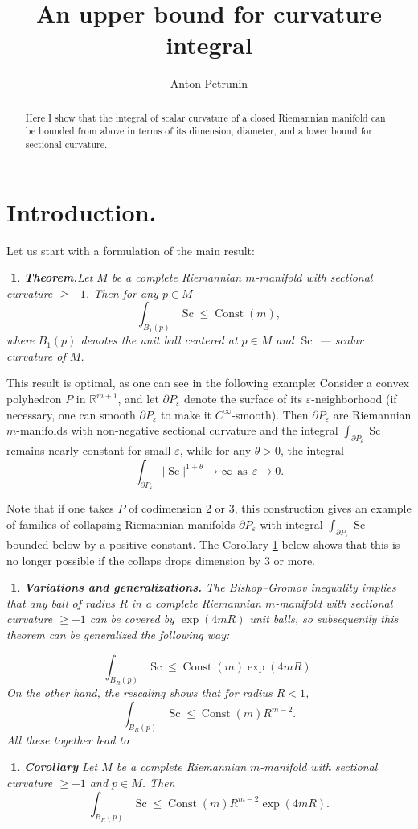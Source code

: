 \documentclass{article}
\def\thetitle{An upper bound for curvature integral}
\def\theauthors{Anton Petrunin}
\def\RR{\mathbb{R}}
\def\eps{\varepsilon}
\def\ge{\geqslant}
\def\le{\leqslant}
\def\Const{\operatorname{Const}}
\def\Sc{\operatorname{Sc}}
\newtheorem{Nothing}[thm]{$\!\!\!$}
\newenvironment{nothing}{\begin{Nothing}\rm}{\end{Nothing}}
\begin{document}
\title{\thetitle}
\author{\theauthors}
\date{}
\maketitle

\begin{abstract}
Here I show that the integral of scalar curvature of a closed Riemannian manifold
can be bounded from above in terms of its dimension, diameter,
and a lower bound for sectional curvature.
\end{abstract}

\section{Introduction.}

Let us start with a formulation of the main result:

\begin{Nothing}{\bf Theorem.}\label{main}
Let $M$ be a complete Riemannian $m$-manifold with sectional curvature $\ge -1$.
Then for any $p\in M$
$$\int_{B_1(p)}\Sc\le \Const(m),$$
where $B_1(p)$ denotes the unit ball centered at $p\in M$ and $\Sc$ --- scalar curvature of $M$.
\end{Nothing}

This result is optimal, as one can see in the following example:
Consider a convex polyhedron $P$ in $\RR^{m+1}$, and let $\partial P_\eps$ denote the surface of its $\eps$-neighborhood (if necessary, one can smooth $\partial P_\eps$ to make it $C^\infty$-smooth).
Then $\partial P_\eps$ are Riemannian $m$-manifolds with non-negative sectional curvature and the integral
$\int_{\partial P_\eps}\Sc$
remains nearly constant for small $\eps$, while for any $\theta>0$, the integral $$\int_{\partial P_\eps}|\Sc|^{1+\theta}\to \infty\ \ \text{as}\ \  \eps\to 0.$$

Note that if one takes $P$ of codimension 2 or 3, this construction gives an example of families of collapsing Riemannian manifolds $\partial P_\eps$ with integral $\int_{\partial P_\eps}\Sc$ bounded below by a positive constant.
The Corollary \ref{cor} below shows that this is no longer possible if the collaps drops dimension by $3$ or more.

\begin{nothing}{\bf Variations and generalizations.}
The Bishop--Gromov inequality implies that any ball of radius $R$ in a complete Riemannian $m$-manifold with sectional curvature $\ge -1$ can be covered by $\exp(4m R)$ unit balls, so subsequently this theorem can be generalized the following way:

$$\int_{B_R(p)}\Sc\le \Const(m)\exp(4m R).$$
On the other hand, the rescaling shows that
for radius $R<1$,
$$\int_{B_R(p)}\Sc\le \Const(m)R^{m-2}.$$
All these together lead to
\end{nothing}
\begin{Nothing}{\bf Corollary} \label{cor} Let $M$ be a complete Riemannian
$m$-manifold with sectional curvature $\ge -1$ and $p\in M$.
Then $$\int_{B_R(p)}\Sc\le \Const(m)R^{m-2}\exp(4m R).$$
\end{Nothing}
\end{document}
